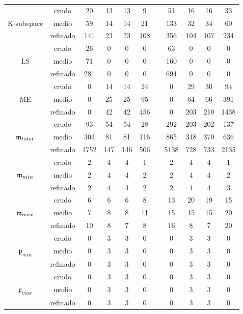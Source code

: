 \begin{table}[htb]
\begin{adjustbox}{width=0.95\columnwidth,center}
\begin{tabular}{ccccccccccc}
			\hline
			& crudo & 20 & 13 & 13 & 9 &  & 51 & 16 & 16 & 33 \\
			K-subspace & medio & 59 & 14 & 14 & 21 &  & 133 & 32 & 34 & 60 \\
			& refinado & 141 & 23 & 23 & 108 &  & 356 & 104 & 107 & 234 \\
			\hline
			& crudo & 26 & 0 & 0 & 0 &  & 63 & 0 & 0 & 0 \\
			LS & medio & 71 & 0 & 0 & 0 &  & 160 & 0 & 0 & 0 \\
			& refinado & 281 & 0 & 0 & 0 &  & 694 & 0 & 0 & 0 \\
			\hline
			& crudo & 0 & 14 & 14 & 24 &  & 0 & 29 & 30 & 94 \\
			ME & medio & 0 & 25 & 25 & 95 &  & 0 & 64 & 66 & 391 \\
			& refinado & 0 & 42 & 42 & 456 &  & 0 & 203 & 210 & 1438 \\
			\hline
			& crudo & 93 & 54 & 54 & 28 &  & 292 & 203 & 202 & 137 \\
			$\mathfrak{m}_{total}$ & medio & 303 & 81 & 81 & 116 &  & 865 & 348 & 370 & 636 \\
			& refinado & 1752 & 147 & 146 & 506 &  & 5138 & 728 & 733 & 2135 \\
			\hline
			& crudo & 2 & 4 & 4 & 1 &  & 2 & 4 & 4 & 1 \\
			$\mathfrak{m}_{min}$ & medio & 2 & 4 & 4 & 2 &  & 2 & 4 & 4 & 2 \\
			& refinado & 2 & 4 & 4 & 2 &  & 2 & 4 & 4 & 3 \\
			\hline
			& crudo & 6 & 6 & 6 & 8 &  & 13 & 20 & 19 & 15 \\
			$\mathfrak{m}_{max}$ & medio & 7 & 8 & 8 & 11 &  & 15 & 15 & 15 & 20 \\
			& refinado & 10 & 8 & 7 & 8 &  & 16 & 8 & 7 & 20 \\
			\hline
			& crudo & 0 & 3 & 3 & 0 &  & 0 & 3 & 3 & 0 \\
			$\mathfrak{p}_{min}$ & medio & 0 & 3 & 3 & 0 &  & 0 & 3 & 3 & 0 \\
			& refinado & 0 & 3 & 3 & 0 &  & 0 & 3 & 3 & 0 \\
			\hline
			& crudo & 0 & 3 & 3 & 0 &  & 0 & 3 & 3 & 0 \\
			$\mathfrak{p}_{max}$ & medio & 0 & 3 & 3 & 0 &  & 0 & 3 & 3 & 0 \\
			& refinado & 0 & 3 & 3 & 0 &  & 0 & 3 & 3 & 0 \\
			\hline
		\end{tabular}
	\end{adjustbox}
\end{table}

